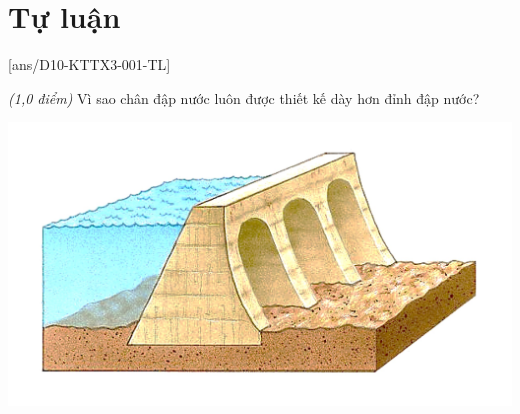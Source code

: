 \section{Tự luận}
\setcounter{ex}{0}
[ans/D10-KTTX3-001-TL]
\begin{ex}\textit{(1,0 điểm)} 
	Vì sao chân đập nước luôn được thiết kế dày hơn đỉnh đập nước?
	\begin{center}
		\includegraphics[scale=0.4]{../figs/D10-KTTX3-001-5}
	\end{center}
	\loigiai{}
\end{ex}
